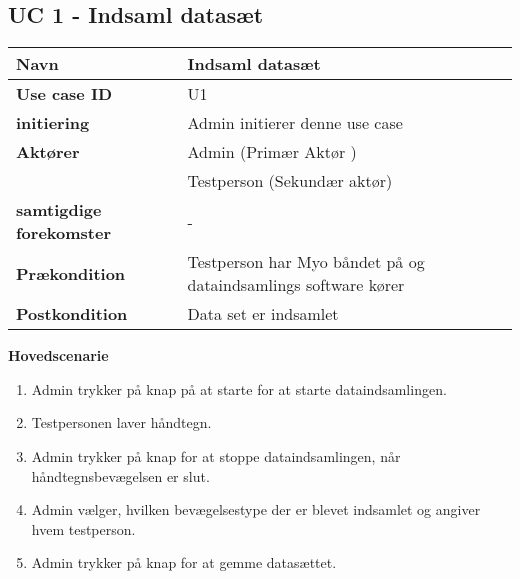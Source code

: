 \subsection{UC 1 - Indsaml datasæt}
\begin{table}[htbp] 
	\begin{tabular}{|p{5cm}|p{9cm}|}
		\hline
		\textbf{Navn} & Indsaml datasæt \\ \hline
		\textbf{Use case ID} & U1 \\ \hline
		\textbf{initiering} & Admin initierer denne use case \\ \hline
		\textbf{Aktører} & Admin (Primær Aktør ) \\ & Testperson (Sekundær aktør) \\ \hline
		\textbf{samtigdige forekomster} & - \\ \hline
		\textbf{Prækondition} & Testperson har Myo båndet på og dataindsamlings software kører \\ \hline
		\textbf{Postkondition} & Data set er indsamlet \\ \hline
	\end{tabular}
\end{table}
\textbf{Hovedscenarie}
\begin{enumerate}
	\item Admin trykker på knap på at starte for at starte dataindsamlingen.
	\item Testpersonen laver håndtegn.
	\item Admin trykker på knap for at stoppe dataindsamlingen, når håndtegnsbevægelsen er slut.
	\item Admin vælger, hvilken bevægelsestype der er blevet indsamlet og angiver hvem testperson.
	\item Admin trykker på knap for at gemme datasættet.
\end{enumerate}

